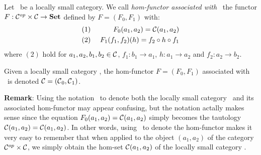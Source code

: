 \begin{defin}\label{Fun:def:hom:functor}
    Let \Cat\ be a locally small category. We call {\em hom-functor associated
    with} \Cat\ the functor $F:\mbox{${\cal C}^{op}$}\times\mbox{$\cal C$}\to\mbox{\bf Set}$ defined by $F=(F_{0},F_{1})$
    with:
        \begin{eqnarray*}
            (1)&\ &F_{0}(a_{1},a_{2}) = \mbox{$\cal C$}(a_{1},a_{2})\\
            (2)&\ &F_{1}(f_{1},f_{2})(h) = f_{2}\circ h \circ f_{1}
        \end{eqnarray*}
    where $(2)$ hold for $a_{1},a_{2},b_{1},b_{2}\in\mbox{$\cal C$}$,
    $f_{1}:b_{1}\to a_{1}$, $h:a_{1}\to a_{2}$ and $f_{2}:a_{2}\to b_{2}$.
\end{defin}
\begin{notation}\label{Fun:notation:hom:functor}
    Given a locally small category \Cat, the hom-functor $F=(F_{0},F_{1})$ 
    associated with \Cat\ is denoted $\mbox{$\cal C$}=(\mbox{$\cal C$}_{0},\mbox{$\cal C$}_{1})$.
\end{notation}
\noindent
{\bf Remark}: Using the notation \Cat\ to denote both the locally small category
\Cat\ and its associated hom-functor may appear confusing, but the notation
actally makes sense since the equation $F_{0}(a_{1},a_{2})=
\mbox{$\cal C$}(a_{1},a_{2})$ simply becomes the tautology $\mbox{$\cal C$}(a_{1},a_{2})
=\mbox{$\cal C$}(a_{1},a_{2})$. In other words, using \Cat\ to denote the hom-functor 
makes it very easy to remember that when applied to the object $(a_{1},a_{2})$
of the category $\mbox{${\cal C}^{op}$}\times\mbox{$\cal C$}$, we simply obtain the hom-set 
$\mbox{$\cal C$}(a_{1},a_{2})$ of the locally small category \Cat.

